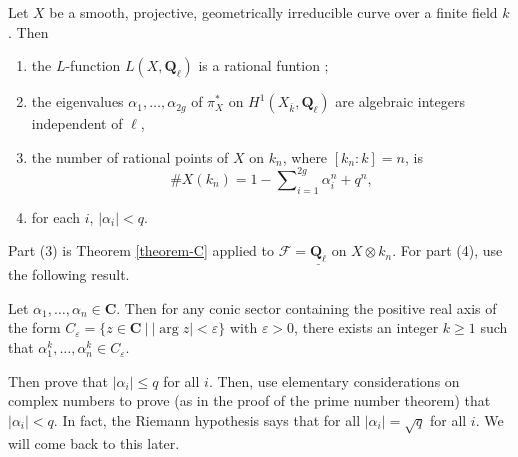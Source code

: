 \begin{lemma}
\label{lemma-count-points-projective}
Let $X$ be a smooth, projective, geometrically irreducible
curve over a finite field $k$. Then
\begin{enumerate}
\item the $L$-function $L(X, \mathbf{Q}_\ell)$ is a rational funtion ;
\item the eigenvalues $\alpha_1, \ldots, \alpha_{2g}$ of $\pi_X^*$ on
$H^1(X_{\bar k}, \mathbf{Q}_\ell)$ are algebraic integers
independent of $\ell$,
\item the number of rational points of $X$ on $k_n$, where $[k_n: k] = n$, is
$$
\# X(k_n) = 1 - \sum\nolimits_{i=1}^{2g}\alpha_i^n + q^n,
$$
\item for each $i$, $|\alpha_i| < q$.
\end{enumerate}
\end{lemma}

\noindent
Part (3) is Theorem \ref{theorem-C} applied to $\mathcal{F} =
\underline{\mathbf{Q}_\ell}$ on $X\otimes k_n$. For part (4), use the
following result.

\begin{exercise}
\label{exercise-powers}
Let $\alpha_1, \dots, \alpha_n \in \mathbf{C}$. Then for any conic sector
containing the positive real axis of the form $C_\varepsilon = \{ z \in
\mathbf{C} \ | \ |\arg z| < \varepsilon \}$ with $\varepsilon >0$, there exists
an integer $k \geq 1$ such that $\alpha_1^k, \dots, \alpha_n^k \in
C_\varepsilon$.
\end{exercise}

\noindent
Then prove that $|\alpha_i| \leq q$ for all $i$. Then, use elementary
considerations on complex numbers to prove (as in the proof of the prime number
theorem) that $|\alpha_i| < q$. In fact, the Riemann hypothesis says that for
all $|\alpha_i| = \sqrt q$ for all $i$. We will come back to this later.

